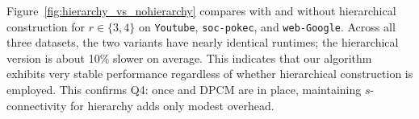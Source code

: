 Figure~\ref{fig:hierarchy_vs_nohierarchy} compares \cbnd with and without hierarchical construction for $r\in\{3,4\}$ on \texttt{Youtube}, \texttt{soc-pokec}, and \texttt{web-Google}.
Across all three datasets, the two variants have nearly identical runtimes; the hierarchical version is about 10\% slower on average.
This indicates that our \cbnd algorithm exhibits very stable performance regardless of whether hierarchical construction is employed.
%
This confirms Q4: once \cpi and DPCM are in place, maintaining $s$-connectivity for hierarchy adds only modest overhead.




